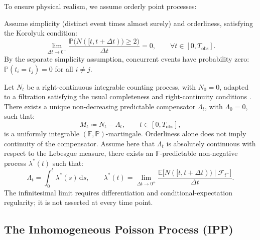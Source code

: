 To ensure physical realism, we assume orderly point processes:
\begin{assumption}
  \label{ass:orderly}
  Assume simplicity (distinct event times almost surely) and orderliness,
  satisfying the Korolyuk condition:
  \begin{equation}
    \lim_{\Delta t \to 0^+} \frac{\mathbb{P}\bigl(N([t, t+\Delta t))
    \ge 2\bigr)}{\Delta t} = 0, \qquad \forall t \in [0, T_{\mathrm{obs}}].
    \label{eq:korolyuk_condition}
  \end{equation}
  By the separate simplicity assumption, concurrent events have
  probability zero:
  $\mathbb{P}(t_i = t_j) = 0$ for all $i \ne j$.
\end{assumption}

\begin{theorem}
  \label{thm:doob_meyer}
  Let $N_t$ be a right-continuous integrable counting process, with $N_0=0$,
  adapted to a filtration satisfying the usual completeness and
  right-continuity conditions \parencite{meyer1962}. There exists a unique
  non-decreasing predictable compensator $\Lambda_t$, with
  $\Lambda_0=0$, such that:
  \begin{equation}
    M_t \coloneqq N_t - \Lambda_t, \qquad t \in [0, T_{\mathrm{obs}}],
    \label{eq:doob_meyer}
  \end{equation}
  is a uniformly integrable $(\mathbb{F}, \mathbb{P})$-martingale.
  Orderliness alone does not imply continuity of the compensator.
  Assume here that $\Lambda_t$ is absolutely continuous with respect to the
  Lebesgue measure, there exists an $\mathbb{F}$-predictable
  non-negative process $\lambda^*(t)$ such that:
  \begin{equation}
    \Lambda_t = \int_0^t \lambda^*(s) \, \mathrm{d}s, \qquad
    \lambda^*(t) = \lim_{\Delta t \to 0^+}
    \frac{\mathbb{E}\bigl[N([t, t+\Delta t)) \mid
    \mathcal{F}_{t^-}\bigr]}{\Delta t}.
    \label{eq:compensator_intensity}
  \end{equation}
  The infinitesimal limit requires differentiation and conditional-expectation
  regularity; it is not asserted at every time point.
\end{theorem}

\subsection{The Inhomogeneous Poisson Process (IPP)}
\label{subsec:ipp_theory}

